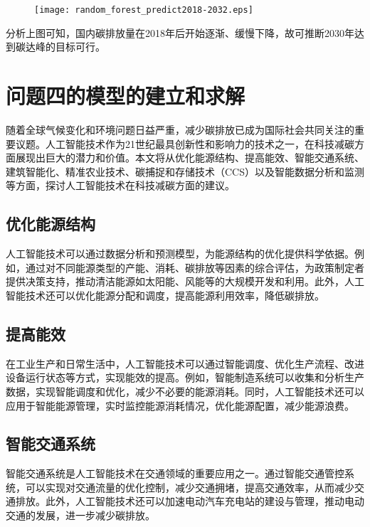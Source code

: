 \documentclass[withoutpreface,bwprint]{cumcmthesis}
\begin{document}
\begin{figure}[htb]
	\centering
	\texttt{[image: random\_forest\_predict2018-2032.eps]}
	\label{fig:randomforestpredict2018-2032}
\end{figure}

分析上图可知，国内碳排放量在2018年后开始逐渐、缓慢下降，故可推断2030年达到碳达峰的目标可行。


	


\section{问题四的模型的建立和求解}
随着全球气候变化和环境问题日益严重，减少碳排放已成为国际社会共同关注的重要议题。人工智能技术作为21世纪最具创新性和影响力的技术之一，在科技减碳方面展现出巨大的潜力和价值。本文将从优化能源结构、提高能效、智能交通系统、建筑智能化、精准农业技术、碳捕捉和存储技术（CCS）以及智能数据分析和监测等方面，探讨人工智能技术在科技减碳方面的建议。

\subsection{优化能源结构}
人工智能技术可以通过数据分析和预测模型，为能源结构的优化提供科学依据。例如，通过对不同能源类型的产能、消耗、碳排放等因素的综合评估，为政策制定者提供决策支持，推动清洁能源如太阳能、风能等的大规模开发和利用。此外，人工智能技术还可以优化能源分配和调度，提高能源利用效率，降低碳排放。

\subsection{提高能效}
在工业生产和日常生活中，人工智能技术可以通过智能调度、优化生产流程、改进设备运行状态等方式，实现能效的提高。例如，智能制造系统可以收集和分析生产数据，实现智能调度和优化，减少不必要的能源消耗。同时，人工智能技术还可以应用于智能能源管理，实时监控能源消耗情况，优化能源配置，减少能源浪费。

\subsection{智能交通系统}
智能交通系统是人工智能技术在交通领域的重要应用之一。通过智能交通管控系统，可以实现对交通流量的优化控制，减少交通拥堵，提高交通效率，从而减少交通排放。此外，人工智能技术还可以加速电动汽车充电站的建设与管理，推动电动交通的发展，进一步减少碳排放。
\end{document}
